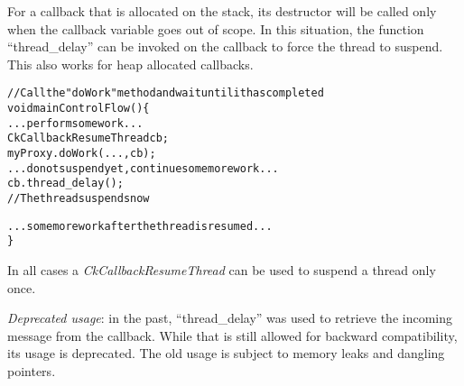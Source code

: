 For a callback that is allocated on the stack, its destructor will be called only
when the callback variable goes out of scope. In this
situation, the function ``thread\_delay'' can be invoked on the callback to
force the thread to suspend. This also works for heap allocated callbacks.

\begin{alltt}
// Call the "doWork" method and wait until it has completed
void mainControlFlow() \{
  ...perform some work...
  CkCallbackResumeThread cb;
  myProxy.doWork(...,cb);
  ...do not suspend yet, continue some more work...
  cb.thread\_delay();
  // The thread suspends now

  ...some more work after the thread is resumed...
\}
\end{alltt}

In all cases a {\em CkCallbackResumeThread} can be used to suspend a thread
only once.

{\em Deprecated usage}: in the past, ``thread\_delay'' was used to retrieve the
incoming message from the callback. While that is still allowed for backward
compatibility, its usage is deprecated. The old usage is subject to memory
leaks and dangling pointers.

